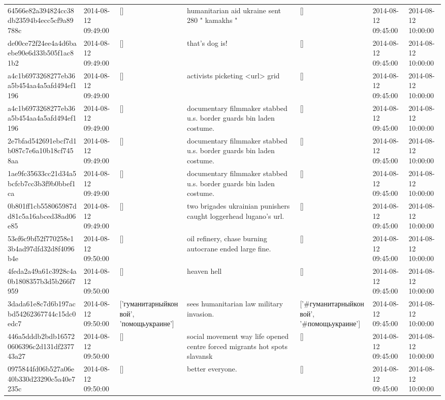 \begin{tabular}{lllllll}
64566e82a394824cc38db23594b4ecc5cf9a89788c & 2014-08-12 09:49:00 & [] & humanitarian aid ukraine sent 280 " kamakhs " & [] & 2014-08-12 09:45:00 & 2014-08-12 10:00:00 \\
de00ce72f24ee4a4d6baebe90e6d33b505f1ac81b2 & 2014-08-12 09:49:00 & [] & that's dog is! & [] & 2014-08-12 09:45:00 & 2014-08-12 10:00:00 \\
a4c1b6973268277eb36a5b454aa4a5afd494ef1196 & 2014-08-12 09:49:00 & [] & activists picketing <url> grid & [] & 2014-08-12 09:45:00 & 2014-08-12 10:00:00 \\
a4c1b6973268277eb36a5b454aa4a5afd494ef1196 & 2014-08-12 09:49:00 & [] & documentary filmmaker stabbed u.s. border guards bin laden costume. & [] & 2014-08-12 09:45:00 & 2014-08-12 10:00:00 \\
2e7bfad542691ebcf7d1b087c7e6a10b18cf7458aa & 2014-08-12 09:49:00 & [] & documentary filmmaker stabbed u.s. border guards bin laden costume. & [] & 2014-08-12 09:45:00 & 2014-08-12 10:00:00 \\
1ae9fc35633cc21d34a5bcfcb7cc3b3f9b0bbef1ca & 2014-08-12 09:49:00 & [] & documentary filmmaker stabbed u.s. border guards bin laden costume. & [] & 2014-08-12 09:45:00 & 2014-08-12 10:00:00 \\
0b801ff1cb558065987dd81c5a16abced38ad06e85 & 2014-08-12 09:49:00 & [] & two brigades ukrainian punishers caught loggerhead lugano's url. & [] & 2014-08-12 09:45:00 & 2014-08-12 10:00:00 \\
53ef6c9bf52f770258e13b4ad97dfd32d8f4096b4e & 2014-08-12 09:50:00 & [] & oil refinery, chase burning autocrane ended large fine. & [] & 2014-08-12 09:45:00 & 2014-08-12 10:00:00 \\
4feda2a49a61c3928c4a0b1808357b3d5b266f7959 & 2014-08-12 09:50:00 & [] & heaven hell & [] & 2014-08-12 09:45:00 & 2014-08-12 10:00:00 \\
3dada61e8c7d6b197acbd54262367744c15dc0edc7 & 2014-08-12 09:50:00 & ['гуманитарныйконвой', 'помощьукраине'] & sees humanitarian law military invasion. & ['#гуманитарныйконвой', '#помощьукраине'] & 2014-08-12 09:45:00 & 2014-08-12 10:00:00 \\
446a5dddb2bdb165720606396c2d131df237743a27 & 2014-08-12 09:50:00 & [] & social movement way life opened centre forced migrants hot spots slavansk & [] & 2014-08-12 09:45:00 & 2014-08-12 10:00:00 \\
0975844fd06b527a06e40b330d23290c5a40e7235c & 2014-08-12 09:50:00 & [] & better everyone. & [] & 2014-08-12 09:45:00 & 2014-08-12 10:00:00 \\

\end{tabular}
